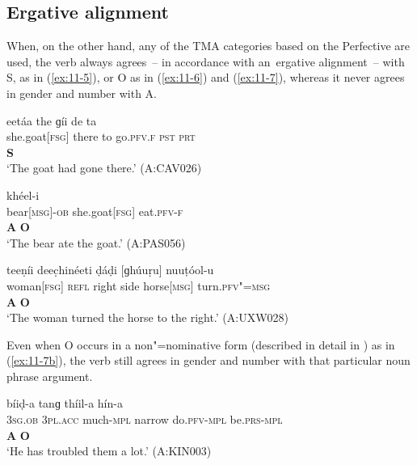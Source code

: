 \subsection{Ergative alignment}
\label{subsec:11-1-2}


When, on the other hand, any of the TMA categories based on the Perfective are used, the verb always agrees~-- in accordance with an~ergative alignment~-- with S, as in (\ref{ex:11-5}), or O as in (\ref{ex:11-6}) and (\ref{ex:11-7}), whereas it never agrees in gender and number with A.

\begin{exe}
\ex
\label{ex:11-5}
\glll [čhéeli] eetáa the ɡíi de ta \\
she.goat[\textsc{fsg}] there to go.\textsc{pfv.}\textsc{f} \textsc{pst} \textsc{prt} \\
 \textbf{S} \\
\glt `The goat had gone there.' (A:CAV026)

\ex
\label{ex:11-6}
\glll [ínc̣-a] [čhéeli] khéel-i \\
bear[\textsc{msg}]-\textsc{ob} she.goat[\textsc{fsg}] eat.\textsc{pfv-}\textsc{f} \\
\textbf{A} \textbf{O} \\
\glt `The bear ate the goat.' (A:PAS056)

\ex
\label{ex:11-7}
\glll [kúṛi] teeṇíi deec̣hinéeti ḍáḍi [ɡhúuṛu] nuuṭóol-u \\
woman[\textsc{fsg}] \textsc{refl} right side horse[\textsc{msg}] turn.\textsc{pfv"=msg} \\
\textbf{A} {} {} {}  \textbf{O} \\
\glt `The woman turned the horse to the right.' (A:UXW028)
\end{exe}


Even when O occurs in a non"=nominative form (described in detail in ) as in (\ref{ex:11-7b}), the verb still agrees in gender and number with that particular noun phrase argument.

\begin{exe}
\ex
\label{ex:11-7b}
\glll [tíi] [tanaám] bíiḍ-a tanɡ thíil-a hín-a \\
\textsc{3sg.ob} \textsc{3pl.acc} much-\textsc{mpl} narrow do.\textsc{pfv}-\textsc{mpl} be.\textsc{prs}-\textsc{mpl} \\
\textbf{A} \textbf{O} \\
\glt `He has troubled them a lot.' (A:KIN003)
\end{exe}


